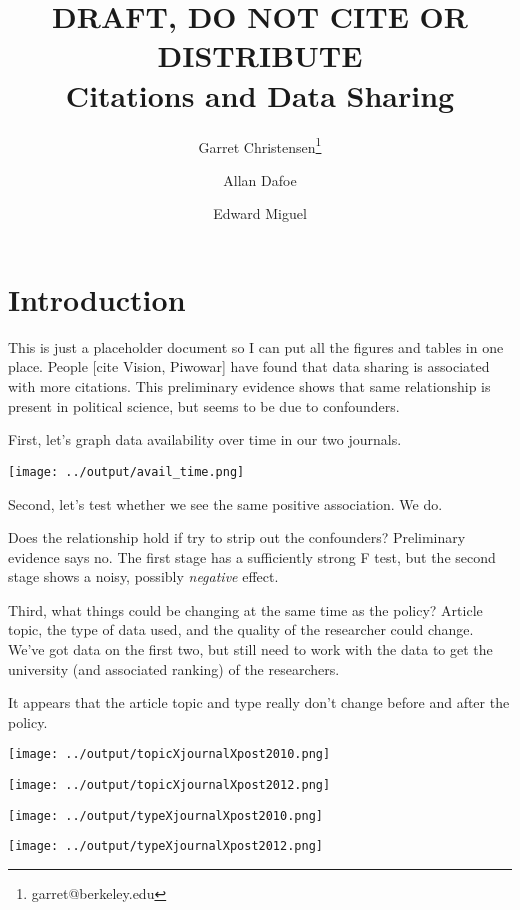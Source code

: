\documentclass[11pt]{article} %
\title{DRAFT, DO NOT CITE OR DISTRIBUTE \\ Citations and Data Sharing}
\author[1]{Garret Christensen\thanks{garret@berkeley.edu}}
\author[2]{Allan Dafoe}
\author[3]{Edward Miguel}
\affil[1]{Berkeley Institute for Data Science}
\affil[2]{Yale University Department of Political Science}
\affil[3]{UC Berkeley Department of Economics and National Bureau of Economic Research}
\date{} %
\begin{document}
\maketitle

\section{Introduction}

This is just a placeholder document so I can put all the figures and tables in one place. People [cite Vision, Piwowar] have found that data sharing is associated with more citations. This preliminary evidence shows that same relationship is present in political science, but seems to be due to confounders.

First, let's graph data availability over time in our two journals.

\texttt{[image: ../output/avail\_time.png]}

Second, let's test whether we see the same positive association. We do.


\clearpage

\clearpage

Does the relationship hold if try to strip out the confounders? Preliminary evidence says no. The first stage has a sufficiently strong F test, but the second stage shows a noisy, possibly \textit{negative} effect.



Third, what things could be changing at the same time as the policy? Article topic, the type of data used, and the quality of the researcher could change. We've got data on the first two, but still need to work with the data to get the university (and associated ranking) of the researchers.

It appears that the article topic and type really don't change before and after the policy.

\texttt{[image: ../output/topicXjournalXpost2010.png]}

\texttt{[image: ../output/topicXjournalXpost2012.png]}

\texttt{[image: ../output/typeXjournalXpost2010.png]}

\texttt{[image: ../output/typeXjournalXpost2012.png]}
\end{document}
